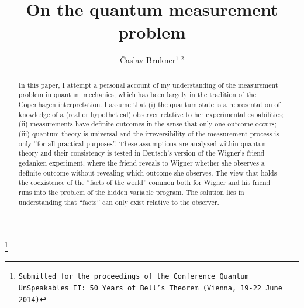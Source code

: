 \documentclass[12pt,a4]{article}
\renewcommand{\thefootnote}{\fnsymbol{footnote}}
\begin{document}
\renewcommand{\thefootnote}{\arabic{footnote}}

\title{On the quantum measurement problem}


\author{{\v C}aslav Brukner$^{1,2}$}
 \thanks{\texttt{Submitted for the proceedings of the Conference Quantum UnSpeakables II: 50 Years of Bell's Theorem (Vienna, 19-22 June 2014)}}


\date{\vspace{-5ex}}
  \maketitle
  \begin{abstract}

In this paper, I attempt a personal account of my understanding of the measurement problem in quantum mechanics, which has been largely in the tradition of the Copenhagen interpretation. I assume that (i) the quantum state is a representation of knowledge of a (real or hypothetical) observer relative to her experimental capabilities; (ii)  measurements have definite outcomes in the sense that only one outcome occurs; (iii) quantum theory is universal and the irreversibility of the measurement process is only ``for all practical purposes''. These assumptions are analyzed within quantum theory and their consistency is tested in Deutsch's version of the Wigner's friend gedanken experiment, where the friend reveals to Wigner whether she observes a definite outcome without revealing which outcome she observes. The view that holds the coexistence of the ``facts of the world'' common both for Wigner and his friend runs into the problem of the hidden variable program. The solution lies in understanding that ``facts'' can only exist relative to the observer. 

\end{abstract}
\end{document}
